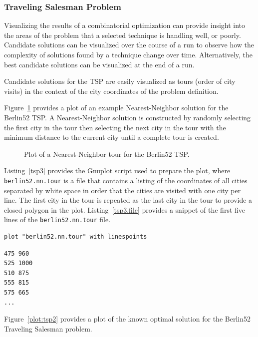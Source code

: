 \subsubsection{Traveling Salesman Problem}
Visualizing the results of a combinatorial optimization can provide insight into the areas of the problem that a selected technique is handling well, or  poorly.
Candidate solutions can be visualized over the course of a run to observe how the complexity of solutions found by a technique change over time. Alternatively, the best candidate solutions can be visualized at the end of a run. 

Candidate solutions for the TSP are easily visualized as tours (order of city visits) in the context of the city coordinates of the problem definition.

Figure~\ref{plot:tsp3} provides a plot of an example Nearest-Neighbor solution for the Berlin52 TSP. A Nearest-Neighbor solution is constructed by randomly selecting the first city in the tour then selecting the next city in the tour with the minimum distance to the current city until a complete tour is created. 

\begin{figure}[htp]
\centering

\caption{Plot of a Nearest-Neighbor tour for the Berlin52 TSP.}
\label{plot:tsp3}
\end{figure}

Listing~\ref{tsp3} provides the Gnuplot script used to prepare the plot, where \texttt{berlin52.nn.tour} is a file that contains a listing of the coordinates of all cities separated by white space in order that the cities are visited with one city per line. The first city in the tour is repeated as the last city in the tour to provide a closed polygon in the plot.
Listing~\ref{tsp3.file} provides a snippet of the first five lines of the \texttt{berlin52.nn.tour} file.

\begin{lstlisting}[caption=Gnuplot script for plotting a tour for a TSP., label=tsp3]
plot "berlin52.nn.tour" with linespoints
\end{lstlisting}

\begin{lstlisting}[caption=Snippet of the berlin52.nn.tour file., label=tsp3.file]
475 960
525 1000
510 875
555 815
575 665
...
\end{lstlisting}

Figure~\ref{plot:tsp2} provides a plot of the known optimal solution for the Berlin52 Traveling Salesman problem. 

